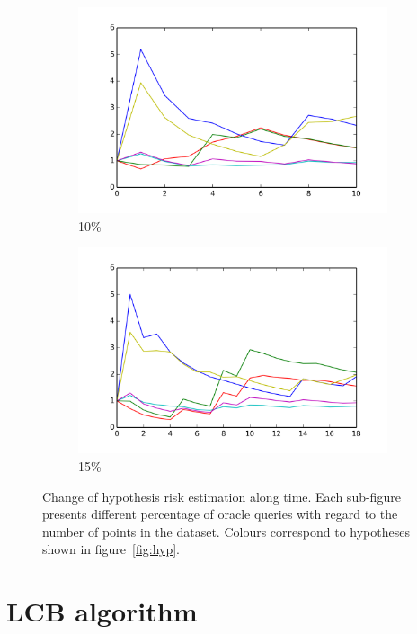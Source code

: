 \documentclass[12pt, a4paper, pdflatex, leqno, twoside]{report}
\begin{document}
\begin{figure}[htbp]
    \begin{subfigure}{.5\linewidth}\centering
    \includegraphics[width=1.1\textwidth]{graphics/convergence10.png}
    \caption{10\%\label{fig:conv.ALL:10}}
  \end{subfigure}
  \begin{subfigure}{.5\linewidth}\centering
    \includegraphics[width=1.1\textwidth]{graphics/convergence15.png}
    \caption{15\%\label{fig:conv.ALL:15}}
  \end{subfigure}

  \caption{Change of hypothesis risk estimation along time. Each sub-figure 
presents different percentage of oracle queries with regard to the number of 
points in the dataset. Colours correspond to hypotheses shown in 
figure~\ref{fig:hyp}.\label{fig:conv.ALL}}
\end{figure}


\section{LCB algorithm}
\end{document}
